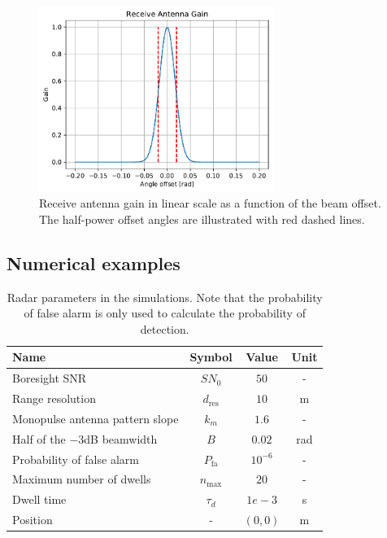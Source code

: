 \documentclass[english, 12pt, a4paper, elec, utf8, a-1b, online]{aaltothesis}
\numberwithin{equation}{section}
\begin{document}
\begin{figure}[t]
    \centering
    \includegraphics[width=0.68\textwidth]{figures/benchmark/rx_antenna_gain.pdf}
    \caption{Receive antenna gain in linear scale as a function of the beam offset. 
    The half-power offset angles are illustrated with red dashed lines.}
    \label{fig:beamwidth}
\end{figure}

\subsection{Numerical examples}\label{sec:ri_setup}


\bgroup
\def \arraystretch{1.25}
\begin{table}[tb]
    \centering
    \begin{tabular}{|l|c|c|c|}
    \hline
    \textbf{Name}              & \textbf{Symbol} & \textbf{Value}  & \textbf{Unit}\\ \hline
    Boresight SNR              & $SN_0$          & $50$ & -          \\ \hline
    Range resolution            & $d_\text{res}$  & $10$ & m  \\ \hline
    Monopulse antenna pattern slope  & $k_m$      & $1.6$ & -  \\ \hline
    Half of the $-3$dB beamwidth & $B$             & $0.02$ & rad         \\ \hline
    Probability of false alarm & $P_\text{fa}$   & $10^{-6}$ & -      \\ \hline
    Maximum number of dwells   & $n_\text{max}$  & $20$ & -  \\ \hline
    Dwell time                 & $\tau_d$          & $1e-3$ & s   \\ \hline
    Position                   & -               & $(0, 0)$ & m \\ \hline
    \end{tabular}
    \caption{Radar parameters in the simulations. Note that the probability of false alarm is only used to calculate the probability of detection.}
    \label{tab:radar_parameters}
\end{table}
\egroup
\end{document}
